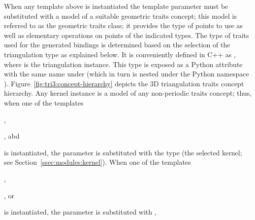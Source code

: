 When any template above is instantiated the template parameter
 must be substituted with a model of a suitable
geometric traits concept; this model is referred to as the geometric
traits class; it provides the type of points to use as well as
elementary operations on points of the indicated types. The type of
traits used for the generated bindings is determined based on the
selection of the triangulation type as explained below. It is
conveniently defined in C++ as , where
 is the triangulation instance. This type is exposed
as a Python attribute with the same name under
 (which in turn is nested under the
Python namespace ).
Figure~\ref{fig:tri3:concept-hierarchy} depicts the 3D triangulation
traits concept hierarchy. Any kernel instance is a model of any
non-periodic traits concept; thus, when one of the templates
\begin{compactenum}
\item {},
\item {}, abd
\item {}
\end{compactenum}
is instantiated, the  parameter is substituted
with the  type (the selected kernel; see
Section~\ref{ssec:modules:kernel}). When one of the templates
\begin{compactenum}
\item {},
\item {}, or
\item {}
\end{compactenum}
is instantiated, the  parameter is substituted
with ,
